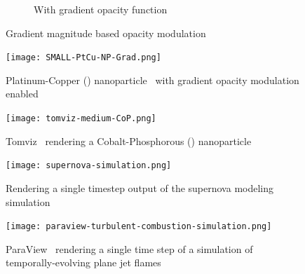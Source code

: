 \begin{figure}[htb]
\begin{subfigure}[b]{0.5\columnwidth}
    \caption{With gradient opacity function}
    \label{fig:Ng2}
  \end{subfigure}
  \caption{Gradient magnitude based opacity modulation}
  \label{fig:gradient}
\end{figure}

\begin{figure}[htb]
  \centering
  \texttt{[image: SMALL-PtCu-NP-Grad.png]}
  \caption{Platinum-Copper () nanoparticle~\protect\citep{scott_electron_2012,
           miao_atomic_2016} with gradient opacity modulation enabled}
  \label{fig:ptcu-grad}
\end{figure}

\begin{figure}[htb]
  \centering
  \texttt{[image: tomviz-medium-CoP.png]}
  \caption{Tomviz~\protect\citep{marcus_hanwell_tomviz_2014} rendering a
           Cobalt-Phosphorous ()
           nanoparticle~\protect\citep{levin_nanomaterial_2016}}
  \label{fig:tomviz-cop}
\end{figure}

\begin{figure}[htb]
  \centering
  \texttt{[image: supernova-simulation.png]}
  \caption{Rendering a single timestep output of the supernova modeling
  simulation~\protect\citep{blondin_pulsar_2007}}
  \label{fig:supernova}
\end{figure}

\begin{figure}[htb]
  \centering
  \texttt{[image: paraview-turbulent-combustion-simulation.png]}
  \caption{ParaView~\protect\citep{ahrens_paraview:_2005, ayachit_paraview_2015,
  ayachit_paraview_2015-1} rendering a single time step of a simulation of
  temporally-evolving plane jet
  flames~\protect\citep{hiroshi_akiba_visualizing_2007}}
  \label{fig:paraview-turbulent-combustion}
\end{figure}
